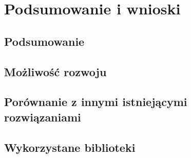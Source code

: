 \chapter{Podsumowanie i wnioski}
\label{cha:podsumowanie}


\section{Podsumowanie}
\label{sec:podsumowanie}


\section{Możliwość rozwoju}
\label{sec:mozliwoscRozwoju}


\section{Porównanie z innymi istniejącymi rozwiązaniami}
\label{sec:porownanieZinnymiRozwiazaniami}


\section{Wykorzystane biblioteki}
\label{sec:wykorzystaneBiblioteki}
